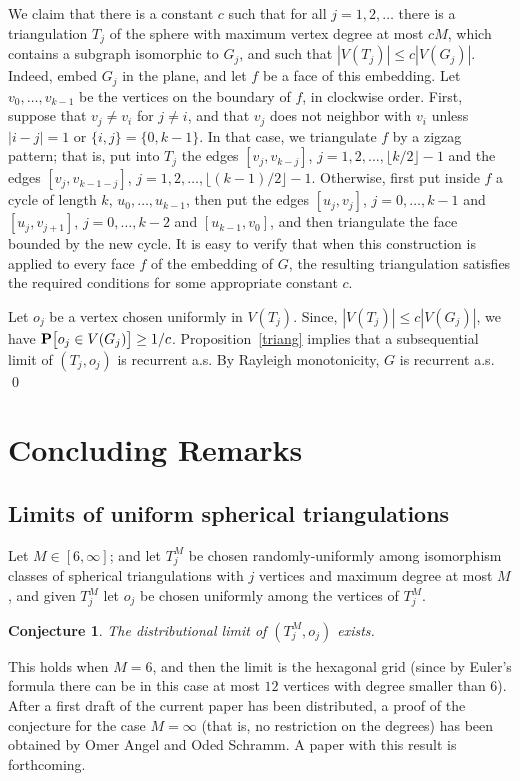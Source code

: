 \documentclass[12pt,naturalnames]{article}
\numberwithin{equation}{section}
\numberwithin{figure}{section}
\numberwithin{theorem}{section}
\newtheorem{conjecture}[theorem]{Conjecture}
\def \P {{\bf P}}
\def\md{\mid}
\def\Bb#1#2{{\def\md{\bigm| }#1\bigl[#2\bigr]}}
\def\Pb{\Bb\P}
\def\proofof#1{{ \medbreak \noindent {\bf Proof of #1.} }}
\begin{document}
\proofof{Theorem \ref{para}}
We claim that there is a constant $c$ such that
for all $j=1,2,\dots$ there is a triangulation $T_j$ of the sphere
with maximum vertex degree at most $c M$, which contains
a subgraph isomorphic to $G_j$, and such that
$|V(T_j)|\le c |V(G_j)|$.  Indeed, embed $G_j$ in the plane,
and let $f$ be a face of this embedding.
Let $v_0,\dots,v_{k-1}$ be the vertices on the boundary
of $f$, in clockwise order.  First, suppose that
$v_j\ne v_{i}$ for $j\ne i$, and that
$v_j$ does not neighbor with $v_i$ unless $|i-j|=1$ or
$\{i,j\}=\{0,k-1\}$.
In that case, we triangulate $f$ by a zigzag pattern;
that is, put into $T_j$ the edges $[v_j,v_{k-j}]$,
$j=1,2,\dots,\lfloor k/2\rfloor-1$
and the edges $[v_j,v_{k-1-j}]$,
$j=1,2,\dots,\lfloor (k-1)/2\rfloor-1$.
Otherwise, first put inside $f$ a cycle of length $k$,
$u_0,\dots,u_{k-1}$, then put the edges
$[u_j,v_j]$, $j=0,\dots,k-1$ and $[u_j,v_{j+1}]$, $j=0,\dots,k-2$
and $[u_{k-1},v_0]$, and then triangulate the face bounded
by the new cycle.
It is easy to verify that when this construction
is applied to every face $f$ of the embedding of $G$, the resulting
triangulation satisfies the required conditions for some appropriate
constant $c$.

Let $o_j$ be a vertex chosen uniformly in  $V(T_j)$.
Since,
$|V(T_j)|\le c |V(G_j)|$, we have $\Pb{o_j\in V(G_j)}\ge 1/c$.
Proposition~\ref{triang} implies that a subsequential limit
of $(T_j,o_j)$ is recurrent a.s.  By Rayleigh monotonicity,
$G$ is recurrent a.s.
\qed


\section{Concluding Remarks}

\subsection{Limits of uniform spherical triangulations}


Let $M\in[6,\infty]$; and let $T^M_j$ be chosen randomly-uniformly among
isomorphism classes of spherical triangulations with $j$ vertices
and maximum degree at most $M$,
and given $T^M_j$ let $o_j$ be chosen uniformly among the vertices
of $T^M_j$.


\begin{conjecture} The distributional limit of $(T^M_j,o_j)$ exists.
\end{conjecture}

This holds when $M=6$, and then the limit is the hexagonal grid
(since by Euler's formula there can be in this case at most $12$
vertices with degree smaller than $6$).
After a first draft of the current paper has been distributed, a proof
of the conjecture for the case $M=\infty$ (that is, no restriction
on the degrees) has been obtained by Omer Angel and Oded Schramm.
A paper with this result is forthcoming.
\end{document}

